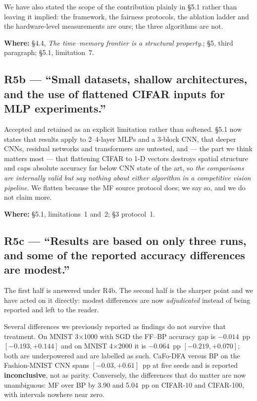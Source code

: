 \documentclass[11pt,a4paper]{article}
\newcommand{\FF}{FF}
\newcommand{\MF}{MF}
\newcommand{\BP}{BP}
\newcommand{\CaFoDFA}{CaFo-DFA}
\newcommand{\where}[1]{\par\smallskip\noindent\textbf{Where:} #1\par}
\begin{document}
We have also stated the scope of the contribution plainly in \S5.1 rather than
leaving it implied: the framework, the fairness protocols, the ablation ladder
and the hardware-level measurements are ours; the three algorithms are not.

\where{\S4.4, \emph{The time--memory frontier is a structural property.};
\S5, third paragraph; \S5.1, limitation~7.}

\subsection*{R5b --- ``Small datasets, shallow architectures, and the use of
flattened CIFAR inputs for MLP experiments.''}

Accepted and retained as an explicit limitation rather than softened. \S5.1
now states that results apply to \numrange{2}{4}-layer MLPs and a 3-block CNN,
that deeper CNNs, residual networks and transformers are untested, and --- the
part we think matters most --- that flattening CIFAR to 1-D vectors destroys
spatial structure and caps absolute accuracy far below CNN state of the art,
so \emph{the comparisons are internally valid but say nothing about either
algorithm in a competitive vision pipeline}. We flatten because the \MF{}
source protocol does; we say so, and we do not claim more.

\where{\S5.1, limitations~1 and~2; \S3 protocol~1.}

\subsection*{R5c --- ``Results are based on only three runs, and some of the
reported accuracy differences are modest.''}

The first half is answered under R4b. The second half is the sharper point and
we have acted on it directly: modest differences are now \emph{adjudicated}
instead of being reported and left to the reader.

Several differences we previously reported as findings do not survive that
treatment. On MNIST 3$\times$1000 with SGD the \FF{}--\BP{} accuracy gap is
$-\num{0.014}$~pp $[-\num{0.193}, +\num{0.144}]$ and on MNIST 4$\times$2000 it
is $-\num{0.064}$~pp $[-\num{0.219}, +\num{0.070}]$; both are underpowered and
are labelled as such. \CaFoDFA{} versus \BP{} on the Fashion-MNIST CNN spans
$[-\num{0.03}, +\num{0.61}]$~pp at five seeds and is reported
\textbf{inconclusive}, not as parity. Conversely, the differences that do
matter are now unambiguous: \MF{} over \BP{} by \num{3.90} and \num{5.04}~pp
on CIFAR-10 and CIFAR-100, with intervals nowhere near zero.
\end{document}
